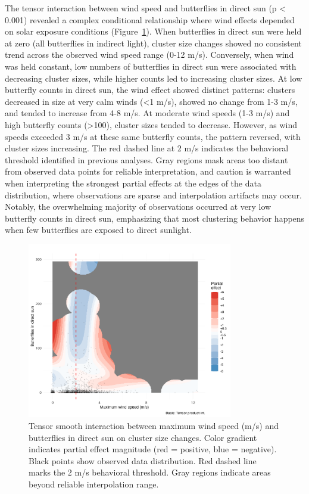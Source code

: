 The tensor interaction between wind speed and butterflies in direct sun (p < 0.001) revealed a complex conditional relationship where wind effects depended on solar exposure conditions (Figure~\ref{fig:interaction_wind_sun}). When butterflies in direct sun were held at zero (all butterflies in indirect light), cluster size changes showed no consistent trend across the observed wind speed range (0-12 m/s). Conversely, when wind was held constant, low numbers of butterflies in direct sun were associated with decreasing cluster sizes, while higher counts led to increasing cluster sizes. At low butterfly counts in direct sun, the wind effect showed distinct patterns: clusters decreased in size at very calm winds (<1 m/s), showed no change from 1-3 m/s, and tended to increase from 4-8 m/s. At moderate wind speeds (1-3 m/s) and high butterfly counts (>100), cluster sizes tended to decrease. However, as wind speeds exceeded 3 m/s at these same butterfly counts, the pattern reversed, with cluster sizes increasing. The red dashed line at 2 m/s indicates the behavioral threshold identified in previous analyses. Gray regions mask areas too distant from observed data points for reliable interpretation, and caution is warranted when interpreting the strongest partial effects at the edges of the data distribution, where observations are sparse and interpolation artifacts may occur. Notably, the overwhelming majority of observations occurred at very low butterfly counts in direct sun, emphasizing that most clustering behavior happens when few butterflies are exposed to direct sunlight. 

\begin{figure}[htbp]
    \centering
    \includegraphics[width=0.8\textwidth]{supplemental/results/30_min/figures/interaction_wind_x_sun_binned.png}
    \caption{Tensor smooth interaction between maximum wind speed (m/s) and butterflies in direct sun on cluster size changes. Color gradient indicates partial effect magnitude (red = positive, blue = negative). Black points show observed data distribution. Red dashed line marks the 2 m/s behavioral threshold. Gray regions indicate areas beyond reliable interpolation range.}
    \label{fig:interaction_wind_sun}
\end{figure}


